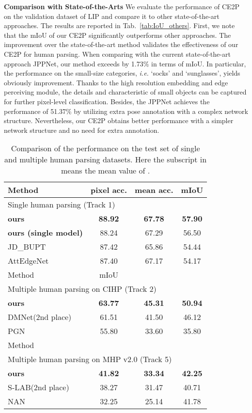 \documentclass[letterpaper]{article} \usepackage{formatting-instructions-latex-2019}  \usepackage{times}  \usepackage{helvet}  \usepackage{courier}  \usepackage{url}  \usepackage{graphicx}  \frenchspacing  \setlength{\pdfpagewidth}{8.5in}  \setlength{\pdfpageheight}{11in}
\newcommand{\ie}{\emph{i.e. }}
\begin{document}
\noindent \textbf{Comparison with State-of-the-Arts} 
We evaluate the performance of CE2P on the validation dataset of LIP and compare it to other state-of-the-art approaches. The results are reported in Tab.~\ref{tab:IoU_others}. First, we note that the mIoU of our CE2P significantly outperforms other approaches. The improvement over the state-of-the-art method validates the effectiveness of our CE2P for human parsing. When comparing with the current state-of-the-art approach JPPNet, our method exceeds by 1.73\% in terms of mIoU. In particular, the performance on the small-size categories, \ie `socks' and `sunglasses', yields obviously improvement. Thanks to the high resolution embedding and edge perceiving module, the details and characteristic of small objects can be captured for further pixel-level classification.  Besides, the JPPNet achieves the performance of 51.37\% by utilizing extra pose annotation with a complex network structure. Nevertheless, our CE2P obtains better performance with a simpler network structure and no need for extra annotation.
\begin{table}[htbp]
    \footnotesize
    \caption{Comparison of the performance on the test set of single and multiple human parsing datasets. Here the subscript  in  means the mean value of .}
    \label{tab:singleChallenge}
    \centering
\begin{tabular}{lccc}
    \toprule         
    Method & pixel acc. & mean acc.  & mIoU  \\ \midrule 
    \multicolumn{4}{l}{Single human parsing (Track 1)} \\  
     \bf{ours} & \bf{88.92} & \bf{67.78} & \bf{57.90}  \\   
     \bf{ours (single model)} & 88.24 &  67.29 &  56.50 \\  
    JD\_BUPT & 87.42 & 65.86 & 54.44  \\    
    AttEdgeNet & 87.40 & 67.17 & 54.17 \\   
    \midrule        
    Method & mIoU &  &    \\\midrule
    \multicolumn{4}{l}{Multiple human parsing on CIHP (Track 2)} \\
    \bf{ours}              &  \bf{63.77} & \bf{45.31}  & \bf{50.94}     \\    
    DMNet(2nd place)            &  61.51      & 41.50       & 46.12          \\
    PGN~\cite{gong2018instance} & 55.80      & 33.60       & 35.80          \\\midrule        
    Method               &  &  &    \\\midrule 
    \multicolumn{4}{l}{Multiple human parsing on MHP v2.0 (Track 5)} \\
    \bf{ours}   & \bf{41.82} & \bf{33.34}  & \bf{42.25}     \\
    S-LAB(2nd place)     & 38.27      & 31.47       & 40.71          \\
    NAN~\cite{Zhao2018}  & 32.25      & 25.14       & 41.78          \\
    \bottomrule  
    \end{tabular}
\end{table}
\end{document}
